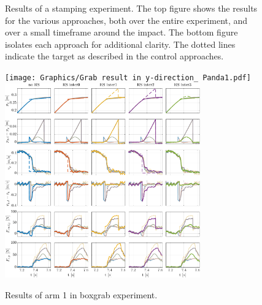 \documentclass[11pt]{report}
\numberwithin{equation}{section}        %
\numberwithin{figure}{section}          %
\numberwithin{table}{section}           %
\begin{document}
\begin{figure}[]
\begin{adjustwidth}{0pt}{5pt}
  \end{adjustwidth}
  \caption{Results of a stamping experiment. The top figure shows the results for the various approaches, both over the entire experiment, and over a small timeframe around the impact. The bottom figure isolates each approach for additional clarity. The dotted lines indicate the target as described in the control approaches.}
  \label{fig:stamp}
  \end{figure}

\begin{figure}[]
  \centering
  \begin{adjustwidth}{0pt}{5pt}
  \centering
  \texttt{[image: Graphics/Grab result in y-direction\_ Panda1.pdf]}\\
    \includegraphics[width=0.75\textwidth]{Graphics/Grab result in y-direction_ Panda1_.pdf}
  \end{adjustwidth}
  \caption{Results of arm 1 in boxgrab experiment.}
  \label{fig:grab1}
  \end{figure}



  \newpage
  


\end{document}
